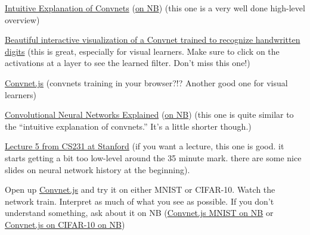 \documentclass[assignment07_Solutions]{subfiles}
\begin{document}
\begin{externalresources}[(60 minutes)]
\bi
\item \href{https://ujjwalkarn.me/2016/08/11/intuitive-explanation-convnets/}{Intuitive Explanation of Convnets} (\href{http://nb.mit.edu/f/55489}{on NB}) (this one is a very well done high-level overview)
\item \href{http://scs.ryerson.ca/~aharley/vis/conv/flat.html}{Beautiful interactive visualization of a Convnet trained to recognize handwritten digits} (this is great, especially for visual learners.  Make sure to click on the activations at a layer to see the learned filter.  Don't miss this one!)
\item \href{https://cs.stanford.edu/people/karpathy/convnetjs/}{Convnet.js} (convnets training in your browser?!? Another good one for visual learners)
\item \href{https://www.datascience.com/blog/convolutional-neural-network}{Convolutional Neural Networks Explained} (\href{http://nb.mit.edu/f/55488}{on NB}) (this one is quite similar to the ``intuitive explanation of convnets.''  It's a little shorter though.)
\item \href{https://www.youtube.com/watch?v=bNb2fEVKeEo&list=PL3FW7Lu3i5JvHM8ljYj-zLfQRF3EO8sYv\&index=5}{Lecture 5 from CS231 at Stanford} (if you want a lecture, this one is good.  it starts getting a bit too low-level around the 35 minute mark.  there are some nice slides on neural network history at the beginning).
\ei
\end{externalresources}

\begin{exercise}[(15 minutes)]
Open up \href{https://cs.stanford.edu/people/karpathy/convnetjs/}{Convnet.js} and try it on either MNIST or CIFAR-10.  Watch the network train.  Interpret as much of what you see as possible.  If you don't understand something, ask about it on NB (\href{http://nb.mit.edu/f/55494}{Convnet.js MNIST on NB} or \href{http://nb.mit.edu/f/55495}{Convnet.js on CIFAR-10 on NB})
\end{exercise}

\end{document}

